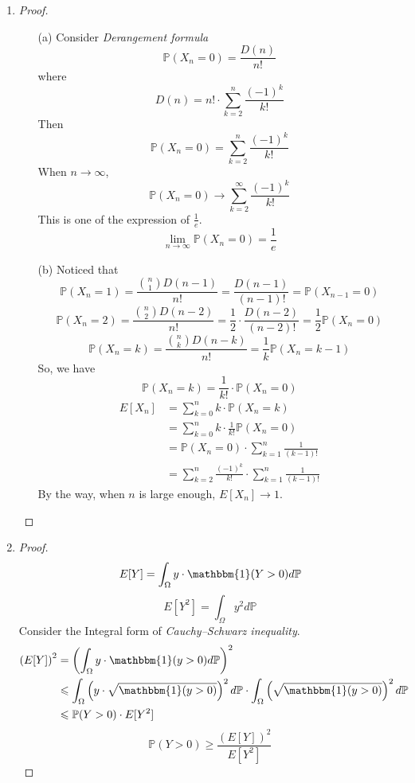 \documentclass{article}
\begin{document}
\begin{enumerate}
        \item \begin{proof}
            \indent
            \begin{itemize}
                \item[(a)]
                    Consider \textit{Derangement formula}
                    $$\mathbb{P}(X_n=0)=\frac{D(n)}{n!}$$
                    where $$D(n)=n!\cdot \sum_{k=2}^{n}\frac{(-1)^k}{k!}$$
                    Then $$\mathbb{P}(X_n=0)=\sum_{k=2}^{n}\frac{(-1)^k}{k!}$$
                    When $n\to \infty$,
                    $$\mathbb{P}(X_n=0)\to\sum_{k=2}^{\infty}\frac{(-1)^k}{k!}$$
                    This is one of the expression of $\frac{1}{e}$.
                    $$\lim_{n\to\infty} \mathbb{P}(X_n=0)=\frac{1}{e}$$
                \item[(b)]
                    Noticed that
                    $$\mathbb{P}(X_n=1) = \frac{{n \choose 1}D(n-1)}{n!}=\frac{D(n-1)}{(n-1)!}=\mathbb{P}(X_{n-1}=0)$$
                    $$\mathbb{P}(X_n=2) = \frac{{n \choose 2}D(n-2)}{n!}=\frac{1}{2}\cdot\frac{D(n-2)}{(n-2)!}=\frac{1}{2}\mathbb{P}(X_{n}=0)$$
                    $$\mathbb{P}(X_n=k) = \frac{{n \choose k}D(n-k)}{n!}=\frac{1}{k}\mathbb{P}(X_n=k-1)$$
                    So, we have
                    $$\mathbb{P}(X_n=k)=\frac{1}{k!}\cdot \mathbb{P}(X_n=0)$$
                    \begin{align*}
                        E[X_n]&=\sum_{k=0}^n k\cdot \mathbb{P}(X_n=k)\\
                        &=\sum_{k=0}^n k\cdot \frac{1}{k!}\mathbb{P}(X_n=0)\\
                        &=\mathbb{P}(X_n=0)\cdot\sum_{k=1}^n \frac{1}{(k-1)!}\\
                        &=\sum_{k=2}^n \frac{(-1)^k}{k!}\cdot \sum_{k=1}^n\frac{1}{(k-1)!}
                    \end{align*}
                    By the way, when $n$ is large enough, $E[X_n] \to 1$.
            \end{itemize}
        \end{proof}
\pagebreak
        \item \begin{proof}
            $$E[Y]=\int_\Omega y\cdot\mathbbm{1}(Y>0) d\mathbb{P}$$
            $$E[Y^2]=\int_\Omega y^2 d\mathbb{P}$$
            Consider the Integral form of \textit{Cauchy–Schwarz inequality}.
            \begin{align*}
                \left(E[Y]\right)^2
                &=\left(\int_\Omega y\cdot\mathbbm{1}(y>0) d\mathbb{P}\right)^2\\
                &\leqslant \int_\Omega \left(y\cdot\sqrt{\mathbbm{1}(y>0)}\right)^2 d\mathbb{P}\cdot \int_\Omega \left(\sqrt{\mathbbm{1}(y>0)}\right)^2 d\mathbb{P}\\
                &\leqslant\mathbb{P}(Y>0)\cdot E[Y^2]
            \end{align*}
            $$\mathbb{P}(Y>0) \geqslant \frac{\left(E[Y]\right)^2}{E[Y^2]}$$
        \end{proof}


\end{enumerate}
\end{document}
